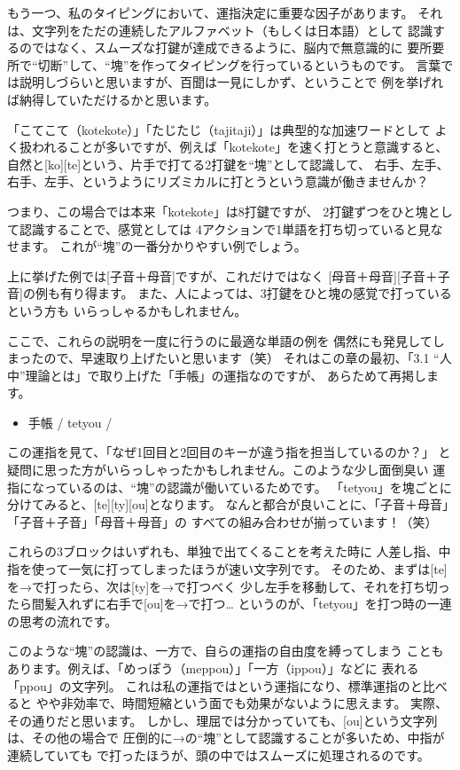 もう一つ、私のタイピングにおいて、運指決定に重要な因子があります。
それは、文字列をただの連続したアルファベット（もしくは日本語）として
認識するのではなく、スムーズな打鍵が達成できるように、脳内で無意識的に
要所要所で“切断”して、“塊”を作ってタイピングを行っているというものです。
言葉では説明しづらいと思いますが、百聞は一見にしかず、ということで
例を挙げれば納得していただけるかと思います。

「こてこて（kotekote）」「たじたじ（tajitaji）」は典型的な加速ワードとして
よく扱われることが多いですが、例えば「kotekote」を速く打とうと意識すると、
自然と[ko][te]という、片手で打てる2打鍵を“塊”として認識して、
右手、左手、右手、左手、というようにリズミカルに打とうという意識が働きませんか？

つまり、この場合では本来「kotekote」は8打鍵ですが、
2打鍵ずつをひと塊として認識することで、感覚としては
4アクションで1単語を打ち切っていると見なせます。
これが“塊”の一番分かりやすい例でしょう。

上に挙げた例では[子音＋母音]ですが、これだけではなく
[母音＋母音][子音＋子音]の例も有り得ます。
また、人によっては、3打鍵をひと塊の感覚で打っているという方も
いらっしゃるかもしれません。


ここで、これらの説明を一度に行うのに最適な単語の例を
偶然にも発見してしまったので、早速取り上げたいと思います（笑）
それはこの章の最初、「3.1 “人中”理論とは」で取り上げた「手帳」の運指なのですが、
あらためて再掲します。
\begin{itemize}
 \item 手帳 / tetyou / 
\end{itemize}
この運指を見て、「なぜ1回目と2回目のキーが違う指を担当しているのか？」
と疑問に思った方がいらっしゃったかもしれません。このような少し面倒臭い
運指になっているのは、“塊”の認識が働いているためです。
「tetyou」を塊ごとに分けてみると、[te][ty][ou]となります。
なんと都合が良いことに、「子音＋母音」「子音＋子音」「母音＋母音」の
すべての組み合わせが揃っています！（笑）

これらの3ブロックはいずれも、単独で出てくることを考えた時に
人差し指、中指を使って一気に打ってしまったほうが速い文字列です。
そのため、まずは[te]を→で打ったら、次は[ty]を→で打つべく
少し左手を移動して、それを打ち切ったら間髪入れずに右手で[ou]を→で打つ…
というのが、「tetyou」を打つ時の一連の思考の流れです。


このような“塊”の認識は、一方で、自らの運指の自由度を縛ってしまう
こともあります。例えば、「めっぽう（meppou）」「一方（ippou）」などに
表れる「ppou」の文字列。
これは私の運指ではという運指になり、標準運指のと比べると
やや非効率で、時間短縮という面でも効果がないように思えます。
実際、その通りだと思います。
しかし、理屈では分かっていても、[ou]という文字列は、その他の場合で
圧倒的に→の“塊”として認識することが多いため、中指が連続していても
で打ったほうが、頭の中ではスムーズに処理されるのです。


